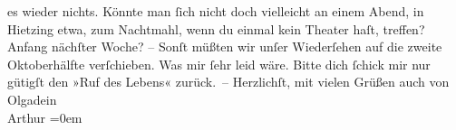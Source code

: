 \begin{ledgroupsized}[t]{13cm}
               es wieder nichts. Könnte man ſich nicht doch vielleicht an einem Abend, in Hietzing etwa, zum Nachtmahl, wenn du einmal kein
               Theater haſt, treffen? Anfang nächſter Woche? – Sonſt müßten wir {\pb}unſer Wiederſehen auf
               die zweite Oktoberhälfte verſchieben. Was mir ſehr leid wäre.\pend
           \pstart
           Bitte dich ſchick mir nur gütigſt den »Ruf des
                  Lebens« zurück. –\pend
           \pstart
           Herzlichſt, mit vielen Grüßen auch von Olgadein{\\[\baselineskip]}\spacefill\mbox{Arthur}\pend
           \leftskip=0em{}\endnumbering{}\end{ledgroupsized}  \newcommand{\dateiname}{L01552}\newcommand{\titel}{Arthur Schnitzler an Hermann Bahr, 28. 9. 1905}\newcommand{\editorInnen}{ Kurt Ifkovits, Martin Anton Müller}
      